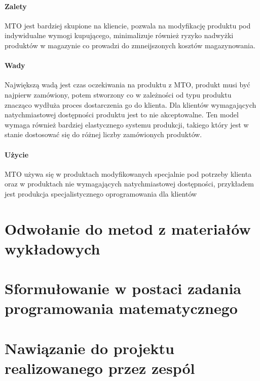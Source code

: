 \documentclass[12pt]{scrartcl}
\begin{document}
		\paragraph{Zalety} MTO jest bardziej skupione na kliencie, pozwala na modyfikację produktu pod indywidualne wymogi kupującego, minimalizuje również ryzyko nadwyżki produktów w magazynie co prowadzi do zmneijszonych kosztów magazynowania. 
		\paragraph{Wady} Największą wadą jest czas oczekiwania na produktu z MTO, produkt musi być najpierw zamówiony, potem stworzony co w zależności od typu produktu znacząco wydłuża proces dostarczenia go do klienta. Dla klientów wymagających natychmiastowej dostępności produktu jest to nie akceptowalne. Ten model wymaga również bardziej elastycznego systemu produkcji, takiego który jest w stanie dostosować się do różnej liczby zamówionych produktów.
		\paragraph{Użycie} MTO używa się w produktach modyfikowanych specjalnie pod potrzeby klienta oraz w produktach nie wymagających natychmiastowej dostępności, przykładem jest produkcja specjalistycznego oprogramowania dla klientów
		
	\section{Odwołanie do metod z materiałów wykładowych}
	\section{Sformułowanie w postaci zadania programowania matematycznego}
	\section{Nawiązanie do projektu realizowanego przez zespól}
	
\end{document}
